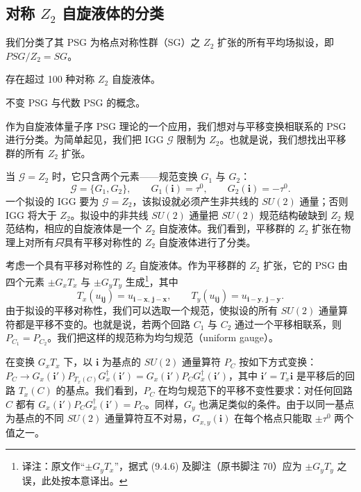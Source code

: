 \subsection{对称 $Z_2$ 自旋液体的分类}

\begin{keypoints}
\item 我们分类了其 PSG 为格点对称性群（SG）之 $Z_2$ 扩张的所有平均场拟设，即 $PSG/Z_2=SG$。
\item 存在超过 100 种对称 $Z_2$ 自旋液体。
\item 不变 PSG 与代数 PSG 的概念。
\end{keypoints}

作为自旋液体量子序 PSG 理论的一个应用，我们想对与平移变换相联系的 PSG 进行分类。为简单起见，我们把 IGG $\mathcal{G}$ 限制为 $Z_2$。也就是说，我们想找出平移群的所有 $Z_2$ 扩张。

当 $\mathcal{G}=Z_2$ 时，它只含两个元素——规范变换 $G_1$ 与 $G_2$：
\begin{equation*}
\mathcal{G}=\{G_1,G_2\},\qquad G_1(\pmb{i})=\tau^0,\qquad G_2(\pmb{i})=-\tau^0.
\end{equation*}
一个拟设的 IGG 要为 $\mathcal{G}=Z_2$，该拟设就必须产生非共线的 $SU(2)$ 通量；否则 IGG 将大于 $Z_2$。拟设中的非共线 $SU(2)$ 通量把 $SU(2)$ 规范结构破缺到 $Z_2$ 规范结构，相应的自旋液体是一个 $Z_2$ 自旋液体。我们看到，平移群的 $Z_2$ 扩张在物理上对所有\emph{只}具有平移对称性的 $Z_2$ 自旋液体进行了分类。

考虑一个具有平移对称性的 $Z_2$ 自旋液体。作为平移群的 $Z_2$ 扩张，它的 PSG 由四个元素 $\pm G_xT_x$ 与 $\pm G_yT_y$ 生成\footnote{译注：原文作“$\pm G_yT_x$”，据式 (9.4.6) 及脚注（原书脚注 70）应为 $\pm G_yT_y$ 之误，此处按本意译出。}，其中
\begin{equation*}
T_x(u_{\pmb{ij}})=u_{\pmb{i}-\pmb{x},\,\pmb{j}-\pmb{x}},\qquad T_y(u_{\pmb{ij}})=u_{\pmb{i}-\pmb{y},\,\pmb{j}-\pmb{y}}.
\end{equation*}
由于拟设的平移对称性，我们可以选取一个规范，使拟设的所有 $SU(2)$ 通量算符都是平移不变的。也就是说，若两个回路 $C_1$ 与 $C_2$ 通过一个平移相联系，则 $P_{C_1}=P_{C_2}$。我们把这样的规范称为均匀规范（uniform gauge）。

在变换 $G_xT_x$ 下，以 $\pmb{i}$ 为基点的 $SU(2)$ 通量算符 $P_C$ 按如下方式变换：$P_C\to G_x(\pmb{i}')P_{T_x(C)}G_x^{\dagger}(\pmb{i}')\allowbreak=G_x(\pmb{i}')P_CG_x^{\dagger}(\pmb{i}')$，其中 $\pmb{i}'=T_x\pmb{i}$ 是平移后的回路 $T_x(C)$ 的基点。我们看到，$P_C$ 在均匀规范下的平移不变性要求：对任何回路 $C$ 都有 $G_x(\pmb{i}')P_CG_x^{\dagger}(\pmb{i}')=P_C$。同样，$G_y$ 也满足类似的条件。由于以同一基点为基点的不同 $SU(2)$ 通量算符互不对易，$G_{x,y}(\pmb{i})$ 在每个格点只能取 $\pm\tau^0$ 两个值之一。

